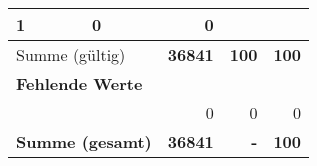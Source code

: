 \begin{longtable}{lXrrr}
       \num{1} &
       \num[round-mode=places,round-precision=2]{0} &
         \num[round-mode=places,round-precision=2]{0} \\
     \midrule
     \multicolumn{2}{l}{Summe (gültig)} &
       \textbf{\num{36841}} &
     \textbf{\num{100}} &
       \textbf{\num[round-mode=places,round-precision=2]{100}} \\
     \multicolumn{5}{l}{\textbf{Fehlende Werte}}\\
      & & 0 & 0 & 0 \\
     \midrule
     \multicolumn{2}{l}{\textbf{Summe (gesamt)}} &
          \textbf{\num{36841}} &
        \textbf{-} &
        \textbf{\num{100}} \\
     \bottomrule
     \end{longtable}
     
